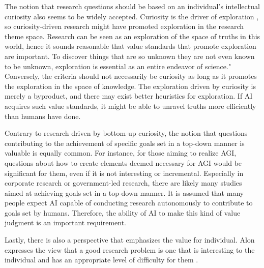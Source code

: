 The notion that research questions should be based on an individual's intellectual curiosity also seems to be widely accepted. Curiosity is the driver of exploration \cite{oudeyer2018computational}, so curiosity-driven research might have promoted exploration in the research theme space. Research can be seen as an exploration of the space of truths in this world, hence it sounds reasonable that value standards that promote exploration are important.
To discover things that are so unknown they are not even known to be unknown, exploration is essential as an entire endeavor of science."
Conversely, the criteria should not necessarily be curiosity as long as it promotes the exploration in the space of knowledge. The exploration driven by curiosity is merely a byproduct, and there may exist better heuristics for exploration. If AI acquires such value standards, it might be able to unravel truths more efficiently than humans have done.


Contrary to research driven by bottom-up curiosity, the notion that questions contributing to the achievement of specific goals set in a top-down manner is valuable is equally common. For instance, for those aiming to realize AGI, questions about how to create elements deemed necessary for AGI would be significant for them, even if it is not interesting or incremental. Especially in corporate research or government-led research, there are likely many studies aimed at achieving goals set in a top-down manner. It is assumed that many people expect AI capable of conducting research autonomously to contribute to goals set by humans. Therefore, the ability of AI to make this kind of value judgment is an important requirement.

Lastly, there is also a perspective that emphasizes the value for individual. Alon expresses the view that a good research problem is one that is interesting to the individual and has an appropriate level of difficulty for them \cite{alon2009choose}.

